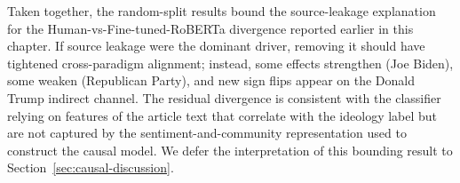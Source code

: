 Taken together, the random-split results bound the source-leakage explanation for the Human-vs-Fine-tuned-RoBERTa divergence reported earlier in this chapter. If source leakage were the dominant driver, removing it should have tightened cross-paradigm alignment; instead, some effects strengthen (Joe Biden), some weaken (Republican Party), and new sign flips appear on the Donald Trump indirect channel. The residual divergence is consistent with the classifier relying on features of the article text that correlate with the ideology label but are not captured by the sentiment-and-community representation used to construct the causal model. We defer the interpretation of this bounding result to Section~\ref{sec:causal-discussion}.
